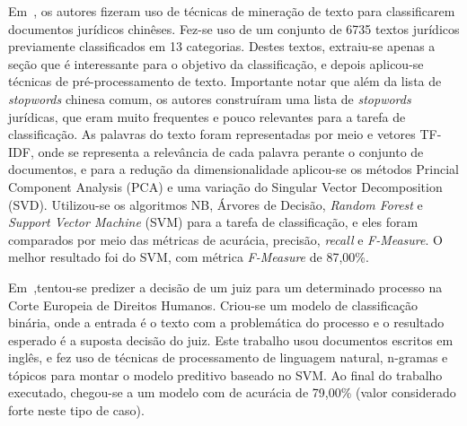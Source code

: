 Em~\cite{chinese}, os autores fizeram uso de técnicas de mineração de texto para classificarem documentos jurídicos chinêses. Fez-se uso de um conjunto de 6735 textos jurídicos previamente classificados em 13 categorias. Destes textos, extraiu-se apenas a seção que é interessante para o objetivo da classificação, e depois aplicou-se técnicas de pré-processamento de texto. Importante notar que além da lista de \textit{stopwords} chinesa comum, os autores construíram uma lista de \textit{stopwords} jurídicas, que eram muito frequentes e pouco relevantes para a tarefa de classificação. As palavras do texto  foram representadas por meio e vetores TF-IDF, onde se representa a relevância de cada palavra perante o conjunto de documentos, e para a redução da dimensionalidade  aplicou-se os métodos Princial Component Analysis (PCA) e uma variação do Singular Vector Decomposition (SVD). Utilizou-se os algoritmos NB, Árvores de Decisão, \textit{Random Forest} e \textit{Support Vector Machine }(SVM) para a tarefa de classificação, e eles foram comparados por meio das métricas de acurácia, precisão, \textit{recall} e \textit{F-Measure}. O melhor resultado foi do SVM, com métrica \textit{F-Measure} de 87,00\%.

Em~\cite{european_court},tentou-se predizer a decisão de um juiz para um determinado processo na Corte Europeia de Direitos Humanos. Criou-se um modelo de classificação binária, onde a entrada é o texto com a problemática do processo e o resultado esperado é a suposta decisão do juiz. Este trabalho usou documentos escritos em inglês, e fez uso de técnicas de processamento de linguagem natural, n-gramas e tópicos para montar o modelo preditivo baseado no SVM. Ao final do trabalho executado, chegou-se a um modelo com de acurácia de 79,00\% (valor considerado forte neste tipo de caso).











